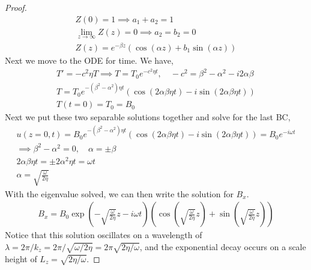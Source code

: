 \documentclass{article}
\begin{document}
\begin{proof}
\begin{gather*}
        Z(0) = 1 \implies a_1 + a_2 = 1\\
        \lim_{z\to\infty}Z(z) = 0 \implies a_2 = b_2 = 0\\
        Z(z) = e^{-\beta z}\left(\cos(\alpha z) + b_1\sin(\alpha z)\right)
    \end{gather*}
    Next we move to the ODE for time. We have, 
    \begin{gather*}
        T' = -c^2\eta T \implies T = T_0e^{-c^2\eta t}, \quad -c^2 = \beta^2 -
        \alpha^2 -  i2\alpha\beta \\
        T = T_0e^{-(\beta^2 - \alpha^2)\eta t}\left(\cos(2\alpha\beta\eta t)
        - i\sin(2\alpha\beta\eta t)\right)\\
        T(t=0) = T_0 = B_0
    \end{gather*}
    Next we put these two separable solutions together and solve for the last
    BC,
    \begin{gather*}
        u(z=0,t) = B_0e^{-(\beta^2-\alpha^2)\eta t}\left(\cos(2\alpha\beta\eta t)
        - i\sin(2\alpha\beta\eta t)\right) = B_0e^{-i\omega t} \\
        \implies \beta^2 - \alpha^2 = 0, \quad \alpha = \pm \beta \\
        2\alpha\beta\eta t = \pm 2\alpha^2\eta t = \omega t\\
        \alpha = \sqrt{\frac{\omega}{2\eta}}
    \end{gather*}
    With the eigenvalue solved, we can then write the solution for $B_x$. 
    \begin{gather*}
        B_x = B_0\exp\left(-\sqrt{\frac{\omega}{2\eta}}z - i\omega
        t\right)\left(\cos\left(\sqrt{\frac{\omega}{2\eta}}z\right) + 
        \sin\left(\sqrt{\frac{\omega}{2\eta}}z\right)\right)
    \end{gather*}
    Notice that this solution oscillates on a wavelength of $\lambda = 2\pi/k_z =
    2\pi/\sqrt{\omega/2\eta} = 2\pi\sqrt{2\eta/\omega}$, and the exponential
    decay occurs on a scale height of $L_z = \sqrt{2\eta/\omega}$. 
\end{proof}
\end{document}
